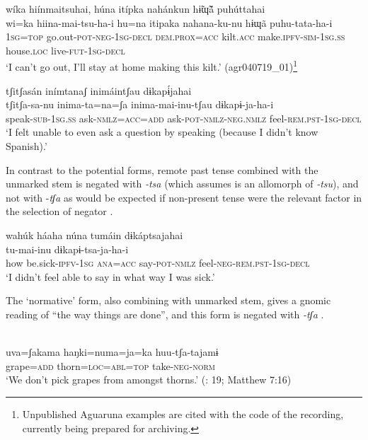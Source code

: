 \documentclass[output=paper,colorlinks,citecolor=brown,draft]{langscibook}
\begin{document}
\ea\label{ex:agu:5}
    \glll wíka hiínmaitsuhai, húna itípka nahánkun hɨ̃ɰ̃ã́  puhúttahai \\ 
           wi=ka  hiina-mai-tsu-ha-i  hu=na  itipaka nahana-ku-nu  hɨɰã  puhu-tata-ha-i\\
          \textsc{1sg=top}  go.out-\textsc{pot-neg-1sg-decl}  \textsc{dem.prox=acc}  kilt.\textsc{acc} make.\textsc{ipfv-sim-1sg.ss}  house.\textsc{loc}  live-\textsc{fut-1sg-decl}\\
    \glt ‘I can’t go out, I’ll stay at home making this kilt.’ (agr040719\_01)\footnote{Unpublished Aguaruna examples are cited with the code of the recording, currently being prepared for archiving.}
\z 

\ea\label{ex:agu:6}
    \glll tʃitʃasán inímtanaʃ inimáintʃau dɨkapɨ́jahai \\ 
          tʃitʃa-sa-nu  inima-ta=na=ʃa  inima-mai-inu-tʃau dɨkapɨ-ja-ha-i\\
          speak-\textsc{sub-1sg.ss}  ask-\textsc{nmlz=acc=add}  ask-\textsc{pot-nmlz-neg.nmlz} feel-\textsc{rem.pst-1sg-decl}\\
    \glt ‘I felt unable to even ask a question by speaking (because I didn’t know Spanish).’ \citep[609]{Overall2017a}
\z 

In contrast to the potential forms, remote past tense combined with the unmarked stem is negated with \textit{{}-tsa} (which \citealt{Overall2017a} assumes is an allomorph of \textit{\nobreakdash-tsu}), and not with \nobreakdash-\textit{tʃa} as would be expected if non-present tense were the relevant factor in the selection of negator .

\ea\label{ex:agu:7}
    \glll wahúk háaha núna tumáin dɨkáptsajahai\\ 
          [wahuka  ha-a-ha  nu=na]  tu-mai-inu dɨkapɨ-tsa-ja-ha-i \\
          how  be.sick-\textsc{ipfv-1sg}  \textsc{ana=acc}  say-\textsc{pot-nmlz} feel-\textsc{neg-rem.pst-1sg-decl} \\
    \glt ‘I didn’t feel able to say in what way I was sick.’ \citep[402]{Overall2017a}
\z 

The ‘normative’ form, also combining with unmarked stem, gives a gnomic reading of “the way things are done”, and this form is negated with \textit{{}-tʃa} .

\ea\label{ex:agu:8}
     \\ 
          uva=ʃakama  haŋki=numa=ja=ka  huu-tʃa-tajamɨ \\
          grape=\textsc{add}  thorn=\textsc{loc=abl=top}  take-\textsc{neg-norm} \\
    \glt ‘We don’t pick grapes from amongst thorns.’ (\citealt{LigaBíblica2008}: 19; Matthew 7:16)
\z 
\end{document}
